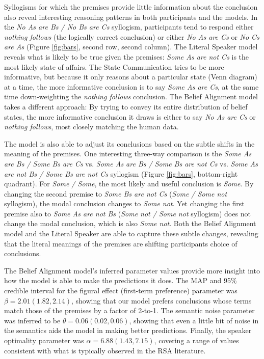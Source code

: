 \documentclass[floatsintext, doc]{apa6}
\newcommand{\ndg}[1]{{\textcolor{Green}{[ndg: #1]}}}
\begin{document}
Syllogisms for which the premises provide little information about the conclusion also reveal interesting reasoning patterns in both participants and the models.
In the \emph{No As are Bs / No Bs are Cs} syllogism, participants tend to respond either \emph{nothing follows} (the logically correct conclusion) or either \emph{No As are Cs} or \emph{No Cs are As} (Figure \ref{fig:bars}, second row, second column). 
The Literal Speaker model reveals what is likely to be true given the premises: \emph{Some As are not Cs} is the most likely state of affairs. 
The State Communication tries to be more informative, but because it only reasons about a particular state (Venn diagram) at a time, the more informative conclusion is to say \emph{Some As are Cs}, at the same time down-weighting the \emph{nothing follows} conclusion.
The Belief Alignment model takes a different approach: By trying to convey its entire distribution of belief states, the more informative conclusion it draws is either to say \emph{No As are Cs} or \emph{nothing follows}, most closely matching the human data. 

The model is also able to adjust its conclusions based on the subtle shifts in the meaning of the premises. One interesting three-way comparison is the \emph{Some As are Bs / Some Bs are Cs} vs. \emph{Some As are Bs / Some Bs are not Cs} vs. \emph{Some As are not Bs / Some Bs are not Cs} syllogism  (Figure \ref{fig:bars}, bottom-right quadrant).
For \emph{Some / Some}, the most likely and useful conclusion is \emph{Some}.
By changing the second premise to \emph{Some Bs are not Cs} (\emph{Some / Some not} syllogism), the modal conclusion changes to \emph{Some not}.
Yet changing the first premise also to \emph{Some As are not Bs} (\emph{Some not / Some not} syllogism) does not change the modal conclusion, which is also \emph{Some not}. 
Both the Belief Alignment model and the Literal Speaker are able to capture these subtle changes, revealing that the literal meanings of the premises are shifting participants choice of conclusions. 

The Belief Alignment model's inferred parameter values provide more insight into how the model is able to make the predictions it does.
The MAP and 95\% credible interval for the figural effect (first-term preference) parameter was  $\beta = 2.01 (1.82, 2.14)$, showing that our model prefers conclusions whose terms match those of the premises by a factor of 2-to-1. 
The semantic noise parameter was inferred to be $\theta = 0.06 (0.02, 0.06)$, showing that even a little bit of noise in the semantics aids the model in making better predictions.
Finally, the speaker optimality parameter was  $\alpha = 6.88 (1.43, 7.15)$, covering a range of values consistent with what is typically observed in the RSA literature. 
\end{document}
